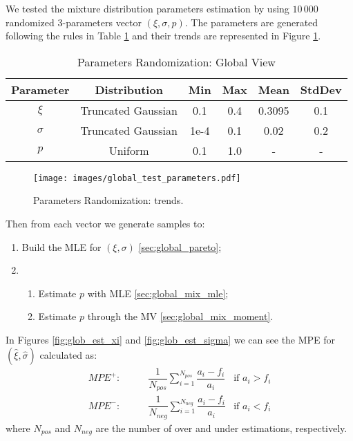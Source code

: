 We tested the mixture distribution parameters estimation by using $10\,000$ randomized 3-parameters vector $(\xi, \sigma, p)$. The parameters are generated following the rules in Table \ref{tab:glob_param} and their trends are represented in Figure \ref{fig:glob_param}.

\begin{table}[!h]
	\begin{center}
		\begin{tabular}{ c c c c c c }
			Parameter & Distribution & Min & Max & Mean & StdDev \\
			\hline
			$\xi$ & Truncated Gaussian & 0.1 & 0.4 & 0.3095 & 0.1 \\
			$\sigma$ & Truncated Gaussian & 1e-4 & 0.1 & 0.02 & 0.2 \\
			$p$ & Uniform & 0.1 & 1.0 & - & -
		\end{tabular}
		\caption{Parameters Randomization: Global View}
		\label{tab:glob_param}
	\end{center}
\end{table}

\begin{figure}[!htbp]
	\begin{center}
		\texttt{[image: images/global\_test\_parameters.pdf]}
	\end{center}
	\caption{Parameters Randomization: trends.}
	\label{fig:glob_param}
\end{figure}

Then from each vector we generate samples to:
\begin{enumerate}
	\item Build the \ac{MLE} for $(\xi, \sigma)$ \eqref{sec:global_pareto};
	\item \begin{enumerate}
		\item Estimate $p$ with \ac{MLE} \eqref{sec:global_mix_mle};
		\item Estimate $p$ through the \ac{MV} \eqref{sec:global_mix_moment}.
	\end{enumerate}
\end{enumerate}

In Figures \ref{fig:glob_est_xi} and \ref{fig:glob_est_sigma} we can see the \ac{MPE} for $(\hat{\xi}, \hat{\sigma})$ calculated as:
\begin{align}
	MPE^+: \quad \quad & \dfrac{1}{N_{pos}} \sum_{i = 1}^{N_{pos}} \dfrac{a_i - f_i}{a_i} & \text{if } a_i > f_i \\
	MPE^-: \quad \quad & \dfrac{1}{N_{neg}} \sum_{i = 1}^{N_{neg}} \dfrac{a_i - f_i}{a_i} & \text{if } a_i < f_i
\end{align}
where $N_{pos}$ and $N_{neg}$ are the number of over and under estimations, respectively.

